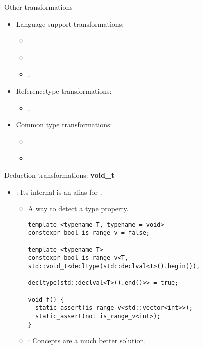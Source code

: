 \begin{frame}[t,fragile]{Other transformations}
\begin{itemize}
  \item Language support transformations:
    \begin{itemize}
      \item {}.
      \item {}.
      \item {}.
    \end{itemize}
  \item Referencetype transformations:
    \begin{itemize}
      \item {}.
    \end{itemize}
  \item Common type transformations:
    \begin{itemize}
      \item {}.
      \item {}
    \end{itemize}
\end{itemize}
\end{frame}

\begin{frame}[t,fragile]{Deduction transformations: \textbf{void\_t}}
\begin{itemize}
  \item {}: Its internal  is an alias for .
    \begin{itemize}
      \item A way to detect a type property.
\begin{lstlisting}
template <typename T, typename = void> 
constexpr bool is_range_v = false;

template <typename T>
constexpr bool is_range_v<T, std::void_t<decltype(std::declval<T>().begin()),
                                         decltype(std::declval<T>().end()>> = true;

void f() {
  static_assert(is_range_v<std::vector<int>>);
  static_assert(not is_range_v<int>); 
}
\end{lstlisting}

      \item {}: Concepts are a much better solution.
    \end{itemize}
\end{itemize}
\end{frame}

